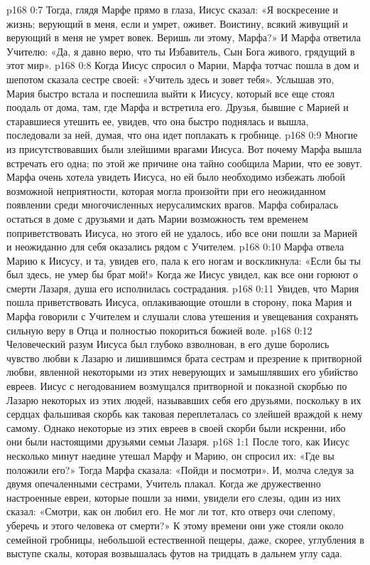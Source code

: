 \vs p168 0:7 Тогда, глядя Марфе прямо в глаза, Иисус сказал: «Я воскресение и жизнь; верующий в меня, если и умрет, оживет. Воистину, всякий живущий и верующий в меня не умрет вовек. Веришь ли этому, Марфа?» И Марфа ответила Учителю: «Да, я давно верю, что ты Избавитель, Сын Бога живого, грядущий в этот мир».
\vs p168 0:8 Когда Иисус спросил о Марии, Марфа тотчас пошла в дом и шепотом сказала сестре своей: «Учитель здесь и зовет тебя». Услышав это, Мария быстро встала и поспешила выйти к Иисусу, который все еще стоял поодаль от дома, там, где Марфа и встретила его. Друзья, бывшие с Марией и старавшиеся утешить ее, увидев, что она быстро поднялась и вышла, последовали за ней, думая, что она идет поплакать к гробнице.
\vs p168 0:9 Многие из присутствовавших были злейшими врагами Иисуса. Вот почему Марфа вышла встречать его одна; по этой же причине она тайно сообщила Марии, что ее зовут. Марфа очень хотела увидеть Иисуса, но ей было необходимо избежать любой возможной неприятности, которая могла произойти при его неожиданном появлении среди многочисленных иерусалимских врагов. Марфа собиралась остаться в доме с друзьями и дать Марии возможность тем временем поприветствовать Иисуса, но этого ей не удалось, ибо все они пошли за Марией и неожиданно для себя оказались рядом с Учителем.
\vs p168 0:10 Марфа отвела Марию к Иисусу, и та, увидев его, пала к его ногам и воскликнула: «Если бы ты был здесь, не умер бы брат мой!» Когда же Иисус увидел, как все они горюют о смерти Лазаря, душа его исполнилась сострадания.
\vs p168 0:11 Увидев, что Мария пошла приветствовать Иисуса, оплакивающие отошли в сторону, пока Мария и Марфа говорили с Учителем и слушали слова утешения и увещевания сохранять сильную веру в Отца и полностью покориться божией воле.
\vs p168 0:12 Человеческий разум Иисуса был глубоко взволнован, в его душе боролись чувство любви к Лазарю и лишившимся брата сестрам и презрение к притворной любви, явленной некоторыми из этих неверующих и замышлявших его убийство евреев. Иисус с негодованием возмущался притворной и показной скорбью по Лазарю некоторых из этих людей, называвших себя его друзьями, поскольку в их сердцах фальшивая скорбь как таковая переплеталась со злейшей враждой к нему самому. Однако некоторые из этих евреев в своей скорби были искренни, ибо они были настоящими друзьями семьи Лазаря.
\vs p168 1:1 После того, как Иисус несколько минут наедине утешал Марфу и Марию, он спросил их: «Где вы положили его?» Тогда Марфа сказала: «Пойди и посмотри». И, молча следуя за двумя опечаленными сестрами, Учитель плакал. Когда же дружественно настроенные евреи, которые пошли за ними, увидели его слезы, один из них сказал: «Смотри, как он любил его. Не мог ли тот, кто отверз очи слепому, уберечь и этого человека от смерти?» К этому времени они уже стояли около семейной гробницы, небольшой естественной пещеры, даже, скорее, углубления в выступе скалы, которая возвышалась футов на тридцать в дальнем углу сада.
